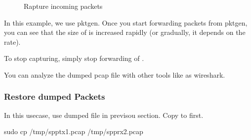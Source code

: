\documentclass[a4paper,11pt,openany,oneside,english]{sphinxmanual}
\begin{document}
\begin{sphinxVerbatim}[commandchars=\\\{\},formatcom=\footnotesize]
\end{sphinxVerbatim}

\begin{figure}[htbp]
\centering
\capstart

\noindent{}
\caption{Rapture incoming packets}\label{\detokenize{usecases/spp_nfv:id7}}\label{\detokenize{usecases/spp_nfv:figure-spp-pcap-incoming}}\end{figure}

In this example, we use pktgen.
Once you start forwarding packets from pktgen, you can see
that the size of  is increased rapidly
(or gradually, it depends on the rate).

\begin{sphinxVerbatim}[commandchars=\\\{\},formatcom=\footnotesize]
\end{sphinxVerbatim}

To stop capturing, simply stop forwarding of .

\begin{sphinxVerbatim}[commandchars=\\\{\},formatcom=\footnotesize]
\end{sphinxVerbatim}

You can analyze the dumped pcap file with other tools like as wireshark.


\subsubsection{Restore dumped Packets}
\label{\detokenize{usecases/spp_nfv:restore-dumped-packets}}
In this usecase, use dumped file in previsou section.
Copy  to  first.

\begin{sphinxVerbatim}[commandchars=\\\{\},formatcom=\footnotesize]
 sudo cp /tmp/spp\PYGZhy{}tx1.pcap /tmp/spp\PYGZhy{}rx2.pcap
\end{sphinxVerbatim}
\end{document}

